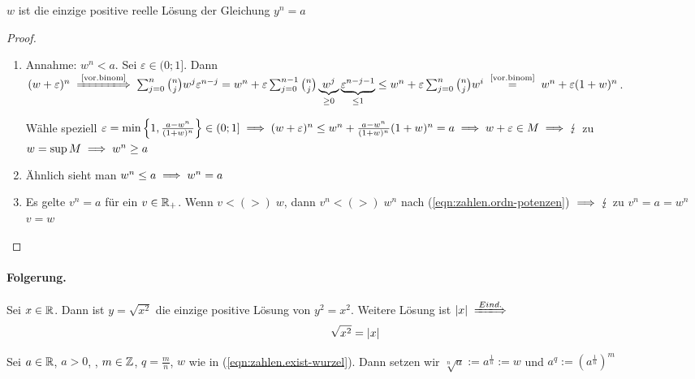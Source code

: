 \documentclass[12pt]{scrreprt}
\begin{document}
\begin{lem}\label{lem:zahlen.wurzel}
$w$ ist die einzige positive reelle Lösung der Gleichung $y^n = a$
\end{lem}
\begin{proof}
\begin{enumerate}
\item Annahme: $w^n<a$. Sei $\varepsilon \in (0;1]$. Dann $(w+\varepsilon)^n \folgtnach{\ref{vor.binom}} \sum^n_{j=0}\binom{n}{j}w^j\varepsilon^{n-j}
= w^n+ \varepsilon \sum^{n-1}_{j=0}\binom{n}{j}\underbrace{w^j}_{\ge 0}\underbrace{\varepsilon^{n-j-1}}_{\le1}
\le w^n + \varepsilon \sum^n_{j=0}\binom{n}{j}w^i \nach{=}{\ref{vor.binom}} w^n + \varepsilon (1+w)^n$.

Wähle speziell $\varepsilon= \min \left\{1,\frac{a-w^n}{(1+w)^n}\right\} \in (0;1] \implies (w+\varepsilon)^n \le w^n +\frac{a-w^n}{(1+w)^n} (1+w)^n=a
\implies w+ \varepsilon \in M \implies \lightning$ zu $w=\sup  M \implies w^n \ge a$
\item Ähnlich sieht man $w^n \le a \implies w^n = a$
\item Es gelte $v^n=a$ für ein $v \in \mathbb{R}_+$. Wenn $v<(>)\;w$, dann $v^n <(>)\;w^n$ nach (\ref{eqn:zahlen.ordn-potenzen}) $\implies \lightning$
zu $v^n = a = w^n$ \folgt $v=w$
\end{enumerate}
\end{proof}

\paragraph{Folgerung.}
Sei $x \in \mathbb{R}$. Dann ist $y = \sqrt{x^2}$ die einzige positive Lösung von $y^2 = x^2$. Weitere Lösung ist $\abs{x} 
\folgtwegen{Eind.}$
\begin{equation}
\sqrt{x^2} = \left\lvert x\right\lvert
\label{eqn:zahlen.betrag-wurzel}
\end{equation}
\begin{dfn}\label{dfn:zahlen.wurzel}
Sei $a \in \mathbb{R}$, $a > 0$, , $m \in \mathbb{Z}$, $q=\frac{m}{n}$, $w$ wie in (\ref{eqn:zahlen.exist-wurzel}).
Dann setzen wir $\sqrt[n]{a} := a^{\frac{1}{n}} := w$ und $a^q:=(a^{\frac{1}{n}})^m$
\end{dfn}
\end{document}
